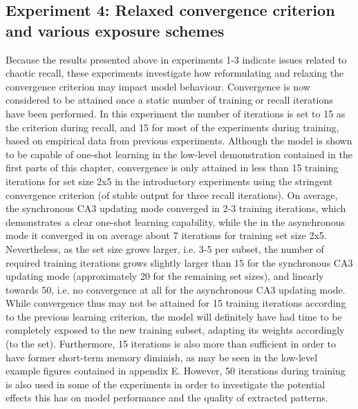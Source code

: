 \subsection{Experiment 4: Relaxed convergence criterion and various exposure schemes}

Because the results presented above in experiments 1-3 indicate issues related to chaotic recall, these experiments investigate how reformulating and relaxing the convergence criterion may impact model behaviour. Convergence is now considered to be attained once a static number of training or recall iterations have been performed. In this experiment the number of iterations is set to 15 as the criterion during recall, and 15 for most of the experiments during training, based on empirical data from previous experiments.
Although the model is shown to be capable of one-shot learning in the low-level demonstration contained in the first parts of this chapter, convergence is only attained in less than 15 training iterations for set size 2x5 in the introductory experiments using the stringent convergence criterion (of stable output for three recall iterations). On average, the synchronous CA3 updating mode converged in 2-3 training iterations, which demonstrates a clear one-shot learning capability, while the in the asynchronous mode it converged in on average about 7 iterations for training set size 2x5. 
%
Nevertheless, as the set size grows larger, i.e. 3-5 per subset, the number of required training iterations grows slightly larger than 15 for the synchronous CA3 updating mode (approximately 20 for the remaining set sizes), and linearly towards 50, i.e. no convergence at all for the asynchronous CA3 updating mode.
While convergence thus may not be attained for 15 training iterations according to the previous learning criterion, the model will definitely have had time to be completely exposed to the new training subset, adapting its weights accordingly (to the set). Furthermore, 15 iterations is also more than sufficient in order to have former short-term memory diminish, as may be seen in the low-level example figures contained in appendix E.
However, 50 iterations during training is also used in some of the experiments in order to investigate the potential effects this has on model performance and the quality of extracted patterns.

